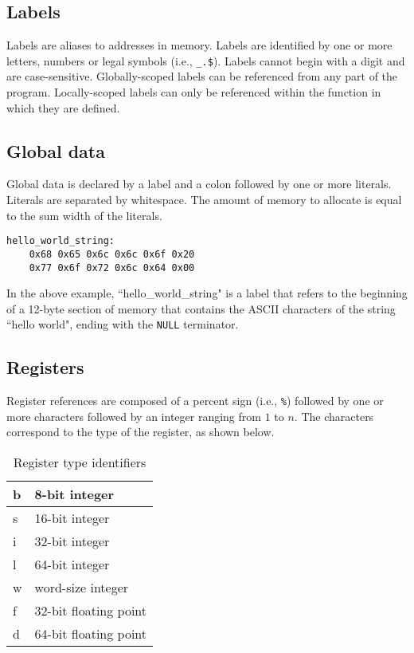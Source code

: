 \subsection{Labels}

Labels are aliases to addresses in memory.
Labels are identified by
one or more letters, numbers or legal symbols (i.e., \texttt{\_.\$}).
Labels cannot begin with a digit and are case-sensitive.
Globally-scoped labels can be referenced from any part of the
program. Locally-scoped labels can only be referenced within
the function in which they are defined.

\subsection{Global data}

Global data is declared by a label and a colon followed by one or more
literals. Literals are separated by whitespace. The amount of memory to allocate
is equal to the sum width of the literals.

\begin{verbatim}
hello_world_string:
    0x68 0x65 0x6c 0x6c 0x6f 0x20
    0x77 0x6f 0x72 0x6c 0x64 0x00
\end{verbatim}

In the above example, ``hello\_world\_string" is a label that refers
to the beginning of a 12-byte section of memory that contains
the ASCII characters of the string ``hello world", ending with the \texttt{NULL} terminator.

\subsection{Registers}

Register references are composed of a percent sign (i.e., \texttt{\%}) followed
by one or more characters followed by an integer ranging from $1$ to $n$. The characters
correspond to the type of the register, as shown below.

\begin{table}[h!]
  \begin{center}
    \begin{tabular}{|l|l|}
      \hline
      b & 8-bit integer         \\ \hline
      s & 16-bit integer        \\ \hline
      i & 32-bit integer        \\ \hline
      l & 64-bit integer        \\ \hline
      w & word-size integer     \\ \hline
      f & 32-bit floating point \\ \hline
      d & 64-bit floating point \\ \hline
    \end{tabular}
  \end{center}
  \caption{Register type identifiers}
\end{table}

